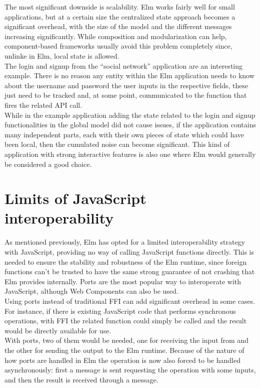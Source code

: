The most significant downside is scalability. Elm works fairly well for small applications, but at a certain size the centralized state approach becomes a significant overhead, with the size of the model and the different messages increasing significantly. While composition and modularization can help, component-based frameworks usually avoid this problem completely since, unlinke in Elm, local state is allowed.\\

The login and signup from the  ``social network'' application are an interesting example. There is no reason any entity within the Elm application needs to know about the username and password the user inputs in the respective fields, these just need to be tracked and, at some point, communicated to the function that fires the related API call.\\

While in the example application adding the state related to the login and signup functionalities in the global model did not cause issues, if the application contains many independent parts, each with their own pieces of state which could have been local, then the cumulated noise can become significant. This kind of application with strong interactive features is also one where Elm would generally be considered a good choice.

\section{Limits of JavaScript interoperability}

As mentioned previously, Elm has opted for a limited interoperability strategy with JavaScript, providing no way of calling JavaScript functions directly. This is needed to ensure the stability and robustness of the Elm runtime, since foreign functions can't be trusted to have the same strong guarantee of not crashing that Elm provides internally. Ports are the most popular way to interoperate with JavaScript, although Web Components can also be used.\\

Using ports instead of traditional FFI can add significant overhead in some cases. For instance, if there is existing JavaScript code that performs synchronous operations, with FFI the related function could simply be called and the result would be directly available for use.\\
With ports, two of them would be needed, one for receiving the input from and the other for sending the output to the Elm runtime. Because of the nature of how ports are handled in Elm the operation is now also forced to be handled asynchronously: first a message is sent requesting the operation with some inputs, and then the result is received through a message.

